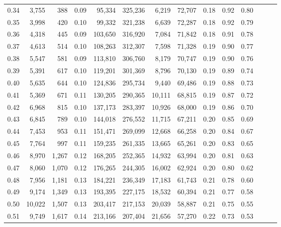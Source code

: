 \begin{tabular}{rrrrrrrrrrrrrr}
0.34 &   3,755 &    388 &  0.09 &   95,334 &  325,236 &   6,219 &  72,707 &  0.18 &  0.92 &      0.80 \\
0.35 &   3,998 &    420 &  0.10 &   99,332 &  321,238 &   6,639 &  72,287 &  0.18 &  0.92 &      0.79 \\
0.36 &   4,318 &    445 &  0.09 &  103,650 &  316,920 &   7,084 &  71,842 &  0.18 &  0.91 &      0.78 \\
0.37 &   4,613 &    514 &  0.10 &  108,263 &  312,307 &   7,598 &  71,328 &  0.19 &  0.90 &      0.77 \\
0.38 &   5,547 &    581 &  0.09 &  113,810 &  306,760 &   8,179 &  70,747 &  0.19 &  0.90 &      0.76 \\
0.39 &   5,391 &    617 &  0.10 &  119,201 &  301,369 &   8,796 &  70,130 &  0.19 &  0.89 &      0.74 \\
0.40 &   5,635 &    644 &  0.10 &  124,836 &  295,734 &   9,440 &  69,486 &  0.19 &  0.88 &      0.73 \\
0.41 &   5,369 &    671 &  0.11 &  130,205 &  290,365 &  10,111 &  68,815 &  0.19 &  0.87 &      0.72 \\
0.42 &   6,968 &    815 &  0.10 &  137,173 &  283,397 &  10,926 &  68,000 &  0.19 &  0.86 &      0.70 \\
0.43 &   6,845 &    789 &  0.10 &  144,018 &  276,552 &  11,715 &  67,211 &  0.20 &  0.85 &      0.69 \\
0.44 &   7,453 &    953 &  0.11 &  151,471 &  269,099 &  12,668 &  66,258 &  0.20 &  0.84 &      0.67 \\
0.45 &   7,764 &    997 &  0.11 &  159,235 &  261,335 &  13,665 &  65,261 &  0.20 &  0.83 &      0.65 \\
0.46 &   8,970 &  1,267 &  0.12 &  168,205 &  252,365 &  14,932 &  63,994 &  0.20 &  0.81 &      0.63 \\
0.47 &   8,060 &  1,070 &  0.12 &  176,265 &  244,305 &  16,002 &  62,924 &  0.20 &  0.80 &      0.62 \\
0.48 &   7,956 &  1,181 &  0.13 &  184,221 &  236,349 &  17,183 &  61,743 &  0.21 &  0.78 &      0.60 \\
0.49 &   9,174 &  1,349 &  0.13 &  193,395 &  227,175 &  18,532 &  60,394 &  0.21 &  0.77 &      0.58 \\
0.50 &  10,022 &  1,507 &  0.13 &  203,417 &  217,153 &  20,039 &  58,887 &  0.21 &  0.75 &      0.55 \\
0.51 &   9,749 &  1,617 &  0.14 &  213,166 &  207,404 &  21,656 &  57,270 &  0.22 &  0.73 &      0.53 \\

\end{tabular}
